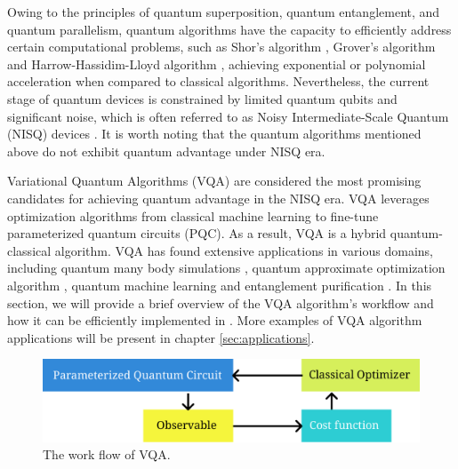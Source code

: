 Owing to the principles of quantum superposition, quantum entanglement, and quantum parallelism, quantum algorithms have the capacity to efficiently address certain computational problems, such as Shor's algorithm \cite{shor1994algorithms}, Grover's algorithm \cite{grover1996fast,long2001grover} and Harrow-Hassidim-Lloyd algorithm \cite{harrow2009quantum}, achieving exponential or polynomial acceleration when compared to classical algorithms. Nevertheless, the current stage of quantum devices is constrained by limited quantum qubits and significant noise, which is often referred to as Noisy Intermediate-Scale Quantum (NISQ) devices \cite{preskill2018quantum}. It is worth noting that the quantum algorithms mentioned above do not exhibit quantum advantage under NISQ era.

Variational Quantum Algorithms (VQA) \cite{cerezo2021variational,yuan2019theory,xu2021variational} are considered the most promising candidates for achieving quantum advantage in the NISQ era. VQA leverages optimization algorithms from classical machine learning to fine-tune parameterized quantum circuits (PQC). As a result, VQA is a hybrid quantum-classical algorithm. VQA has found extensive applications in various domains, including quantum many body simulations \cite{Peruzzo2014Peruzzo2014,kandala2017hardware,kokail2019self,lyu2023variational,Lyu2023symmetryenhanced,cao2022progress}, quantum approximate optimization algorithm \cite{farhi2014quantum,patti2022variational,chandarana2023digitized}, quantum machine learning \cite{benedetti2019parameterized,wei2022quantum,lloyd2018quantum,biamonte2017quantum,abbas2021power} and entanglement purification \cite{zhang2023variational}. In this section, we will provide a brief overview of the VQA algorithm's workflow and how it can be efficiently implemented in \MindQuantum. More examples of VQA algorithm applications will be present in chapter \ref{sec:applications}.

\begin{figure}[h]
  \begin{center}
    \includegraphics[width=0.9\linewidth]{images/4_1_vqa.pdf}
  \end{center}
  \caption{The work flow of VQA.}
  \label{fig:vqa_work_flow}
\end{figure}

